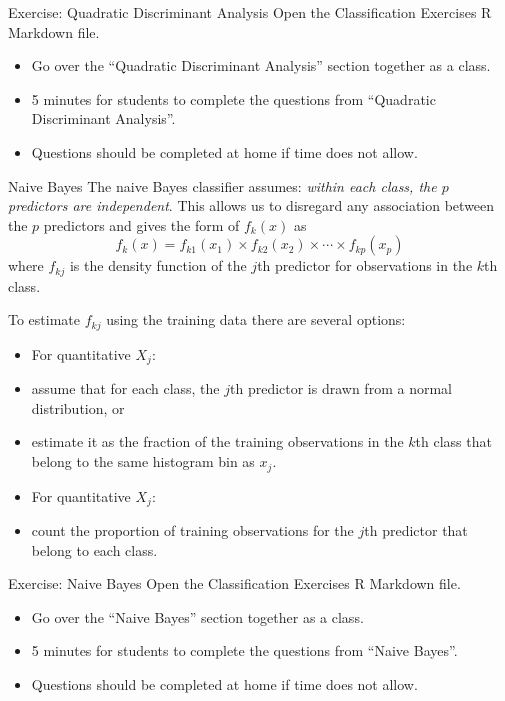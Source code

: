 \documentclass[
  ignorenonframetext,
  aspectratio=169,
]{beamer}
\begin{document}
\begin{frame}{Exercise: Quadratic Discriminant Analysis}
\protect\hypertarget{exercise-quadratic-discriminant-analysis}{}
Open the Classification Exercises R Markdown file.

\begin{itemize}
\item
  Go over the ``Quadratic Discriminant Analysis'' section together as a
  class.
\item
  5 minutes for students to complete the questions from ``Quadratic
  Discriminant Analysis''.
\item
  Questions should be completed at home if time does not allow.
\end{itemize}
\end{frame}

\begin{frame}{Naive Bayes}
\protect\hypertarget{naive-bayes}{}
The naive Bayes classifier assumes:
\textit{within each class, the $p$ predictors are independent}. This
allows us to disregard any association between the \(p\) predictors and
gives the form of \(f_k(x)\) as \[
f_{k}(x)=f_{k 1}\left(x_{1}\right) \times f_{k 2}\left(x_{2}\right) \times \cdots \times f_{k p}\left(x_{p}\right)
\] where \(f_{k j}\) is the density function of the \(j\)th predictor
for observations in the \(k\)th class.

To estimate \(f_{k j}\) using the training data there are several
options:

\begin{itemize}
\item
  For quantitative \(X_j\):
\item
  assume that for each class, the \(j\)th predictor is drawn from a
  normal distribution, or
\item
  estimate it as the fraction of the training observations in the
  \(k\)th class that belong to the same histogram bin as \(x_j\).
\item
  For quantitative \(X_j\):
\item
  count the proportion of training observations for the \(j\)th
  predictor that belong to each class.
\end{itemize}
\end{frame}

\begin{frame}{Exercise: Naive Bayes}
\protect\hypertarget{exercise-naive-bayes}{}
Open the Classification Exercises R Markdown file.

\begin{itemize}
\item
  Go over the ``Naive Bayes'' section together as a class.
\item
  5 minutes for students to complete the questions from ``Naive Bayes''.
\item
  Questions should be completed at home if time does not allow.
\end{itemize}
\end{frame}
\end{document}

